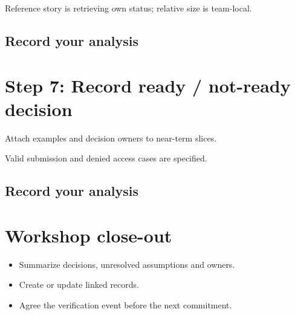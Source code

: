 \documentclass[11pt,letterpaper]{article}
\begin{document}
\begin{tcolorbox}[colback=tealback,colframe=navy,title={Illustration},breakable]
Reference story is retrieving own status; relative size is team-local.

\end{tcolorbox}
\subsection{Record your analysis}
\section{Step 7: Record ready / not-ready decision}
Attach examples and decision owners to near-term slices.

\begin{tcolorbox}[colback=tealback,colframe=navy,title={Illustration},breakable]
Valid submission and denied access cases are specified.

\end{tcolorbox}
\subsection{Record your analysis}
\section{Workshop close-out}
\begin{itemize}[leftmargin=*,itemsep=2pt]
\item Summarize decisions, unresolved assumptions and owners.
\item Create or update linked records.
\item Agree the verification event before the next commitment.
\end{itemize}
\end{document}
